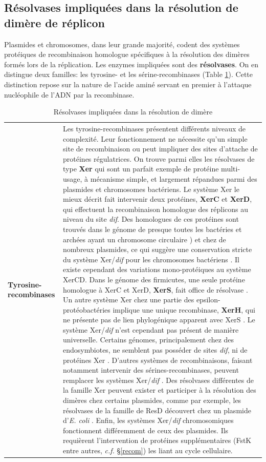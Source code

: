  \subsection{Résolvases impliquées dans la résolution de dimère de réplicon}
	Plasmides et chromosomes, dans leur grande majorité, codent des systèmes protéiques de recombinaison homologue spécifiques à la résolution des dimères formés lors de la réplication. Les enzymes impliquées sont des \textbf{résolvases}. On en distingue deux familles: les tyrosine- et les sérine-recombinases (Table \ref{resolvases}). Cette distinction repose sur la nature de l'acide aminé servant en premier à l'attaque nucléophile de l'ADN par la recombinase.
\\
\begin{longtable}{@{\hspace{-3cm}\hspace{1cm}} >{\bfseries}p{} | >{\small}p{}}
\caption{Résolvases impliquées dans la résolution de dimère}\label{resolvases}\\
\endfirsthead
	Tyrosine-recombinases & Les tyrosine-recombinases présentent différents niveaux de complexité. Leur fonctionnement ne nécessite qu'un simple site de recombinaison ou peut impliquer des sites d'attache de protéines régulatrices. On trouve parmi elles les résolvases de type \textbf{Xer} qui sont un parfait exemple de protéine multi-usage, à mécanisme simple, et largement répandues parmi des plasmides et chromosomes bactériens. Le système Xer le mieux décrit fait intervenir deux protéines, \textbf{XerC} et \textbf{XerD}, qui effectuent la recombinaison homologue des réplicons au niveau du site \textit{dif}. Des homologues de ces protéines sont trouvés dans le génome de presque toutes les bactéries et archées ayant un chromosome circulaire \citep{hallet2004dna,cortez2010evidence}) et chez de nombreux plasmides, ce qui suggère une conservation stricte du système Xer/\textit{dif} pour les chromosomes bactériens \citep{Carnoy2009,Kono2011}. Il existe cependant des variations mono-protéiques au système XerCD. Dans le génome des firmicutes, une seule protéine homologue à XerC et XerD, \textbf{XerS}, fait office de résolvase \citep{Leroux2011}. Un autre système Xer chez une partie des epsilon-protéobactéries implique une unique recombinase, \textbf{XerH}, qui ne présente pas de lien phylogénique apparent avec XerS \citep{Carnoy2009}. Le système Xer/\textit{dif} n'est cependant pas présent de manière universelle. Certains génomes, principalement chez des endosymbiotes, ne semblent pas posséder de sites \textit{dif}, ni de protéines Xer \citep{Carnoy2009,Kono2011}. D'autres systèmes de recombinaisons, faisant notamment intervenir des sérines-recombinases, peuvent remplacer les systèmes Xer/\textit{dif} \citep{Carnoy2009}. Des résolvases différentes de la famille Xer peuvent exister et participer à la résolution des dimères chez certains plasmides, comme par exemple, les résolvases de la famille de ResD découvert chez un plasmide d'\textit{E. coli} \citep{hallet2004dna}. Enfin, les systèmes Xer/\textit{dif} chromosomiques fonctionnent différemment de ceux des plasmides. Ils requièrent l'intervention de protéines supplémentaires (FstK entre autres, \textit{c.f.} \S \ref{recom}) les liant au cycle cellulaire. \\

\end{longtable}
